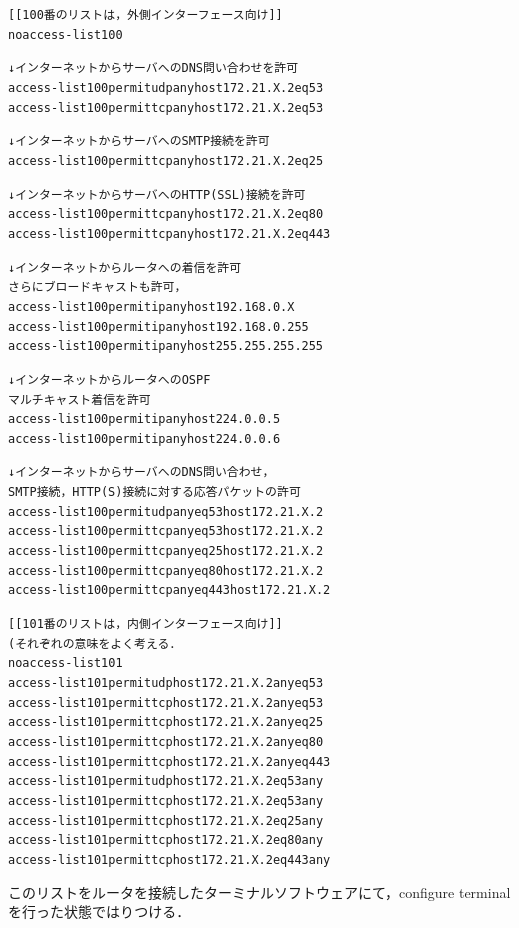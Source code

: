 \begin{center}
\begin{breakbox}
\begin{alltt}
[[100番のリストは，外側インターフェース向け]]
no access-list 100

  ↓ インターネットからサーバへの DNS 問い合わせを許可
access-list 100 permit udp any host 172.21.X.2 eq 53
access-list 100 permit tcp any host 172.21.X.2 eq 53

  ↓ インターネットからサーバへの SMTP 接続を許可
access-list 100 permit tcp any host 172.21.X.2 eq 25

  ↓ インターネットからサーバへの HTTP(SSL) 接続を許可
access-list 100 permit tcp any host 172.21.X.2 eq 80
access-list 100 permit tcp any host 172.21.X.2 eq 443

  ↓ インターネットからルータへの着信を許可
     さらにブロードキャストも許可，
access-list 100 permit ip any host 192.168.0.X
access-list 100 permit ip any host 192.168.0.255
access-list 100 permit ip any host 255.255.255.255

  ↓ インターネットからルータへの OSPF
     マルチキャスト着信を許可
access-list 100 permit ip any host 224.0.0.5
access-list 100 permit ip any host 224.0.0.6

  ↓ インターネットからサーバへの DNS 問い合わせ，
     SMTP 接続，HTTP(S)接続に対する応答パケットの許可
access-list 100 permit udp any eq 53 host 172.21.X.2
access-list 100 permit tcp any eq 53 host 172.21.X.2
access-list 100 permit tcp any eq 25 host 172.21.X.2
access-list 100 permit tcp any eq 80 host 172.21.X.2
access-list 100 permit tcp any eq 443 host 172.21.X.2


[[101 番のリストは，内側インターフェース向け]]
(それぞれの意味をよく考える．
no access-list 101
access-list 101 permit udp host 172.21.X.2 any eq 53
access-list 101 permit tcp host 172.21.X.2 any eq 53
access-list 101 permit tcp host 172.21.X.2 any eq 25
access-list 101 permit tcp host 172.21.X.2 any eq 80
access-list 101 permit tcp host 172.21.X.2 any eq 443
access-list 101 permit udp host 172.21.X.2 eq 53 any
access-list 101 permit tcp host 172.21.X.2 eq 53 any
access-list 101 permit tcp host 172.21.X.2 eq 25 any
access-list 101 permit tcp host 172.21.X.2 eq 80 any
access-list 101 permit tcp host 172.21.X.2 eq 443 any
\end{alltt}
\end{breakbox}
\end{center}

このリストをルータを接続したターミナルソフトウェアにて，configure
terminal を行った状態ではりつける．

